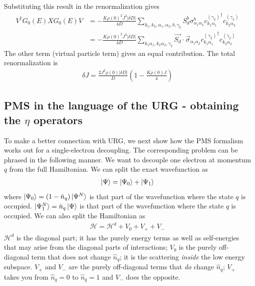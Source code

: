 Substituting this result in the renormalization gives
\begin{equation}\begin{aligned}
	V^\dagger G_0(E)XG_0(E)V &= -\frac{K\rho(0)^2 J^3 |\delta D|}{4D} \sum_{k_1,k_2,\alpha_1,\alpha_2,b,\gamma_2}S_d^b\sigma^b_{\alpha_1 \alpha_2}{c^{(\gamma_2)}_{k_1 \alpha_1}}^\dagger c^{(\gamma_2)}_{k_2 \alpha_2}\\
			    &= -\frac{K\rho(0)^2 J^3 |\delta D|}{4D} \sum_{k_1\alpha_1,k_2 \alpha_2,\gamma_2}\vec{S_d}\cdot\vec{\sigma}_{\alpha_1\alpha_2}{c^{(\gamma_2)}_{k_1 \alpha_1}}^\dagger c^{(\gamma_2)}_{k_2 \alpha_2}
\end{aligned}\end{equation}
The other term (virtual particle term) gives an equal contribution. The total renormalization is
\begin{equation}\begin{aligned}
	\delta J = \frac{2J^2 \rho(0) |\delta D|}{D}\left(1 - \frac{K\rho(0) J}{4}\right)
\end{aligned}\end{equation}


\subsection{PMS in the language of the URG - obtaining the \(\eta\) operators}
To make a better connection with URG, we next show how the PMS formalism works out for a single-electron decoupling. The corresponding problem can be phrased in the following manner. We want to decouple one electron at momentum \(q\) from the full Hamiltonian. We can split the exact wavefunction as
\begin{equation}\begin{aligned}
	\label{wf}
\ket{\Psi} = \ket{\Psi_0} + \ket{\Psi_1}
\end{aligned}\end{equation}
where \(\ket{\Psi_0} = \left(1 - \hat n_{q}\right)\ket{\Psi^N}\) is that part of the wavefunction where the state \(q\) is occupied. \(\ket{\Psi^N_1} = \hat n_q \ket{\Psi}\) is that part of the wavefunction where the state \(q\) is occupied. We can also split the Hamiltonian as
\begin{equation}\begin{aligned}
	\label{hami}
\mathcal{H} = \mathcal{H}^d + V_0 + V_+ + V_-
\end{aligned}\end{equation}
\(\mathcal{H}^d\) is the diagonal part; it has the purely energy terms as well as self-energies that may arise from the diagonal parts of interactions; \(V_0\) is the purely off-diagonal term that does not change \(\hat n_q\); it is the scattering \textit{inside} the low energy subspace. \(V_+\) and \(V_-\) are the purely off-diagonal terms that \textit{do} change \(\hat n_q\); \(V_+\) takes you from \(\hat n_q = 0\) to \(\hat n_q = 1\) and \(V_-\) does the opposite.

